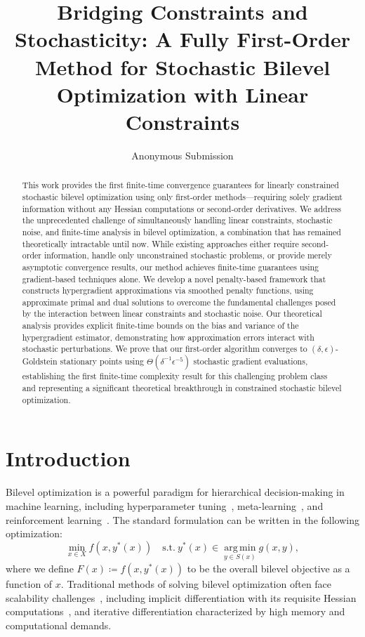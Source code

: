 \documentclass[letterpaper]{article} %
\title{Bridging Constraints and Stochasticity: A Fully First-Order Method for Stochastic Bilevel Optimization with Linear Constraints}
\author{Anonymous Submission}
\date{}
\newcommand{\1}{\mathbf{1}}
\begin{document}
\maketitle

\begin{abstract}
This work provides the first finite-time convergence guarantees for linearly constrained stochastic bilevel optimization using only first-order methods—requiring solely gradient information without any Hessian computations or second-order derivatives. We address the unprecedented challenge of simultaneously handling linear constraints, stochastic noise, and finite-time analysis in bilevel optimization, a combination that has remained theoretically intractable until now. While existing approaches either require second-order information, handle only unconstrained stochastic problems, or provide merely asymptotic convergence results, our method achieves finite-time guarantees using gradient-based techniques alone. We develop a novel penalty-based framework that constructs hypergradient approximations via smoothed penalty functions, using approximate primal and dual solutions to overcome the fundamental challenges posed by the interaction between linear constraints and stochastic noise. Our theoretical analysis provides explicit finite-time bounds on the bias and variance of the hypergradient estimator, demonstrating how approximation errors interact with stochastic perturbations. We prove that our first-order algorithm converges to $(\delta, \epsilon)$-Goldstein stationary points using $\Theta(\delta^{-1}\epsilon^{-5})$ stochastic gradient evaluations, establishing the first finite-time complexity result for this challenging problem class and representing a significant theoretical breakthrough in constrained stochastic bilevel optimization.
\end{abstract}

\section{Introduction}
Bilevel optimization is a powerful paradigm for hierarchical decision-making in machine learning, including hyperparameter tuning~\cite{franceschi2018}, meta-learning~\cite{finn2017model}, and reinforcement learning~\cite{konda1999actor}. The standard formulation can be written in the following optimization:
\begin{equation} \label{eq:intro_bilevel_general}
\min_{x \in X} f(x, y^*(x)) \quad \text{s.t.} ~ y^*(x) \in \operatorname*{arg\,min}_{y \in S(x)} g(x, y),
\end{equation}
where we define $F(x) \coloneqq f(x, y^*(x))$ to be the overall bilevel objective as a function of $x$.
Traditional methods of solving bilevel optimization often face scalability challenges~\cite{pedregosa2016hyperparameter, franceschi2017forward}, including implicit differentiation with its requisite Hessian computations~\cite{amos2017optnet,winqvist2020neural,khanduri2025doubly,hu2023contextual,ghadimi2018approximation}, and iterative differentiation characterized by high memory and computational demands.~\cite{shen2024memory,brauer2024learning}
\end{document}
